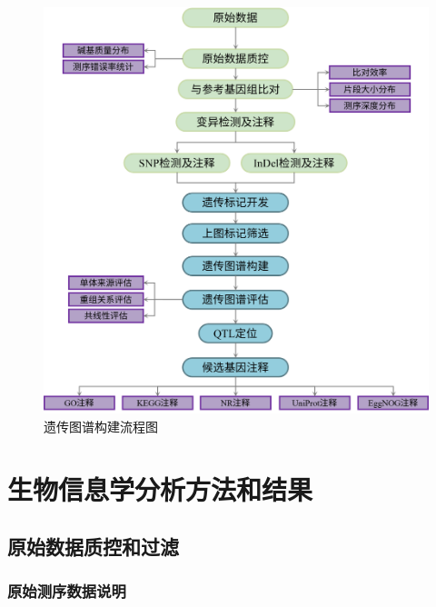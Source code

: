 \documentclass[
  a4paper,
  titlepage]{article}
\begin{document}
\begin{figure}[H]

{\centering \includegraphics[width=1\linewidth]{static/images/pipeline} 

}

\caption{遗传图谱构建流程图}\label{fig:pipeline-plot}
\end{figure}

\clearpage

\clearpage

\hypertarget{ux751fux7269ux4fe1ux606fux5b66ux5206ux6790ux65b9ux6cd5ux548cux7ed3ux679c}{%
\section{生物信息学分析方法和结果}\label{ux751fux7269ux4fe1ux606fux5b66ux5206ux6790ux65b9ux6cd5ux548cux7ed3ux679c}}

\hypertarget{ux539fux59cbux6570ux636eux8d28ux63a7ux548cux8fc7ux6ee4}{%
\subsection{原始数据质控和过滤}\label{ux539fux59cbux6570ux636eux8d28ux63a7ux548cux8fc7ux6ee4}}

\hypertarget{ux539fux59cbux6d4bux5e8fux6570ux636eux8bf4ux660e}{%
\subsubsection{原始测序数据说明}\label{ux539fux59cbux6d4bux5e8fux6570ux636eux8bf4ux660e}}
\end{document}
